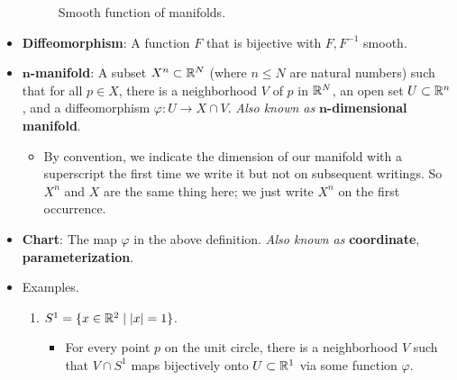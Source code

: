 \documentclass[../notes.tex]{subfiles}
\begin{document}
\begin{itemize}
\begin{figure}[H]
        \caption{Smooth function of manifolds.}
        \label{fig:manifoldSmoothf}
    \end{figure}
    \item \textbf{Diffeomorphism}: A function $F$ that is bijective with $F,F^{-1}$ smooth.
    \item \textbf{$\bm{n}$-manifold}: A subset $X^n\subset\mathbb{R}^N$ (where $n\leq N$ are natural numbers) such that for all $p\in X$, there is a neighborhood $V$ of $p$ in $\mathbb{R}^N$, an open set $U\subset\mathbb{R}^n$, and a diffeomorphism $\varphi:U\to X\cap V$. \emph{Also known as} \textbf{$\bm{n}$-dimensional manifold}.
    \begin{itemize}
        \item By convention, we indicate the dimension of our manifold with a superscript the first time we write it but not on subsequent writings. So $X^n$ and $X$ are the same thing here; we just write $X^n$ on the first occurrence.
    \end{itemize}
    \item \textbf{Chart}: The map $\varphi$ in the above definition. \emph{Also known as} \textbf{coordinate}, \textbf{parameterization}.
    \item Examples.
    \begin{enumerate}
        \item $S^1=\{x\in\mathbb{R}^2\mid |x|=1\}$.
        \begin{itemize}
            \item For every point $p$ on the unit circle, there is a neighborhood $V$ such that $V\cap S^1$ maps bijectively onto $U\subset\mathbb{R}^1$ via some function $\varphi$.
        \end{itemize}
    \end{enumerate}
\end{itemize}
\end{document}
